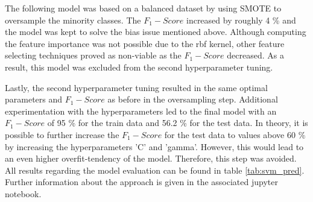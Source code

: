 The following model was based on a balanced dataset by using SMOTE to oversample the minority classes. The $F_1-Score$ increased by roughly 4 \% and the model was kept to solve the bias issue mentioned above. Although computing the feature importance was not possible due to the rbf kernel, other feature selecting techniques proved as non-viable as the $F_1-Score$ decreased. As a result, this model was excluded from the second hyperparameter tuning. 

Lastly, the second hyperparameter tuning resulted in the same optimal parameters and $F_1-Score$ as before in the oversampling step. Additional experimentation with the hyperparameters led to the final model with an $F_1-Score$ of 95 \% for the train data and 56.2 \% for the test data. In theory, it is possible to further increase the $F_1-Score$ for the test data to values above 60 \% by increasing the hyperparameters 'C' and 'gamma'. However, this would lead to an even higher overfit-tendency of the model. Therefore, this step was avoided. All results regarding the model evaluation can be found in table \ref{tab:svm_pred}. Further information about the approach is given in the associated jupyter notebook. 


